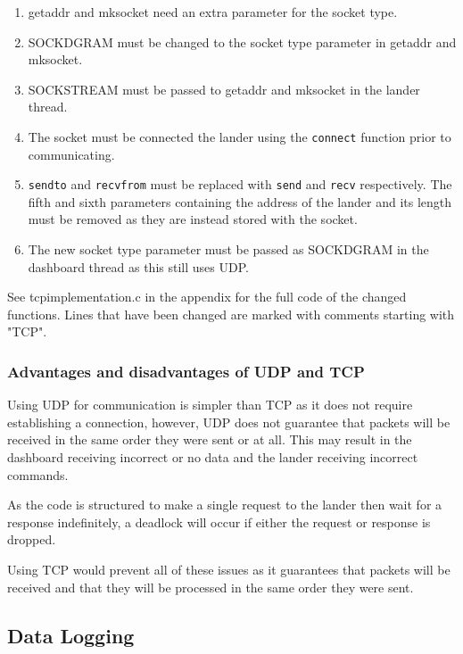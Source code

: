 \documentclass{article}
\newcommand{\code}[1]{\texttt{#1}}
\begin{document}
{    \begin{enumerate}
        \item getaddr and mksocket need an extra parameter for the socket type.
        \item SOCK\textunderscore DGRAM must be changed to the socket type
              parameter in getaddr and mksocket.
        \item SOCK\textunderscore STREAM must be passed to getaddr and mksocket in the lander thread.
        \item The socket must be connected the lander using the \code{connect}
              function prior to communicating.
        \item \code{sendto} and \code{recvfrom} must be replaced with \code{send}
              and \code{recv} respectively. The fifth and sixth parameters containing
              the address of the lander and its length must be removed as they are
              instead stored with the socket.
        \item The new socket type parameter must be passed as SOCK\textunderscore DGRAM in
              the dashboard thread as this still uses UDP.
    \end{enumerate}

    See tcp\textunderscore implementation.c in the appendix for the full
    code of the changed functions. Lines that have been changed are marked
    with comments starting with "TCP".

    \subsubsection{Advantages and disadvantages of UDP and TCP}
    Using UDP for communication is simpler than TCP as it does not require establishing a connection,
    however, UDP does not guarantee that packets will be received in the same
    order they were sent or at all. This may result in the dashboard receiving
    incorrect or no data and the lander receiving incorrect commands.

    As the code is structured to make a single request to the lander then
    wait for a response indefinitely, a deadlock will occur if either the
    request or response is dropped.

    Using TCP would prevent all of these issues as it guarantees that packets
    will be received and that they will be processed in the same order they
    were sent.

    \subsection{Data Logging}

}
\end{document}
